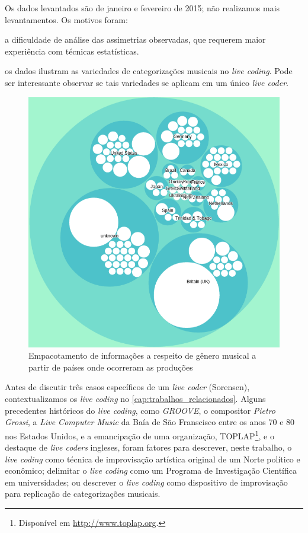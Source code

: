 Os dados levantados são de janeiro e fevereiro de 2015; não realizamos mais levantamentos. Os motivos foram: \begin{inparaenum}
\item a dificuldade de análise das assimetrias observadas, que requerem maior experiência com técnicas estatísticas.
\item os dados ilustram as variedades de categorizações musicais no \emph{live coding}. Pode ser interessante observar se tais variedades se aplicam em um único \emph{live coder}.
\end{inparaenum}

\begin{figure}
\begin{center}
\includegraphics[scale=0.6]{./imagens/zoomable_circle_packing_genre_year_livecoding3.png}
\caption{Empacotamento de informações a respeito de gênero musical a partir de países onde ocorreram as produções}
\label{pacotao3}
\end{center}
\end{figure}

Antes de discutir três casos específicos de um \emph{live coder} (Sorensen), contextualizamos os \emph{live coding} no \autoref{cap:trabalhos_relacionados}. Alguns precedentes históricos do \emph{live coding}, como \emph{GROOVE}, o compositor \emph{Pietro Grossi}, a \emph{Live Computer Music} da Baía de São Franscisco entre os anos 70 e 80 nos Estados Unidos, e a emancipação de uma organização, TOPLAP\footnote{Disponível em \url{http://www.toplap.org}.}, e o destaque de \emph{live coders} ingleses, foram fatores para descrever, neste trabalho, o \emph{live coding} como técnica de improvisação artística original de um Norte político e econômico; delimitar o \emph{live coding} como um Programa de Investigação Científica em universidades; ou descrever o \emph{live coding} como dispositivo de improvisação para replicação de categorizações musicais.

